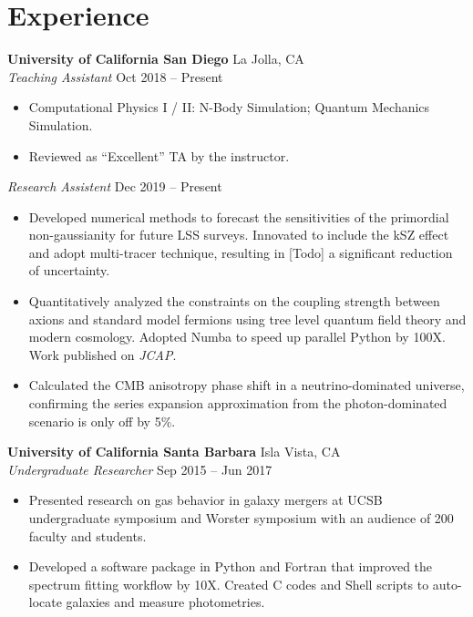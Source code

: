 \documentclass[letterpaper,12pt]{article}
\newenvironment{zitemize}{
\begin{itemize} \vspace{-.9em}\itemsep 0pt \parskip 0pt}
{\end{itemize}\vspace{-.5em}}
\newcommand{\todo}[1]{{\color{red} [Todo] #1}}
\newcommand{\proglang}[1]{#1}
\begin{document}
\section{Experience}
\textbf{University of California San Diego} \hfill La Jolla, CA \\
\textit{Teaching Assistant} \hfill Oct 2018 -- Present \\
\begin{zitemize}
    \item Computational Physics I / II: N-Body Simulation; Quantum Mechanics Simulation. \\
    \item Reviewed as ``Excellent'' TA by the instructor.
\end{zitemize}
\vspace{-0.5em}
\textit{Research Assistent} \hfill Dec 2019 -- Present \\
\begin{zitemize}
    \item Developed numerical methods to forecast the sensitivities of the primordial non-gaussianity for future LSS surveys. Innovated to include the kSZ effect and adopt multi-tracer technique, resulting in \todo{a significant reduction of uncertainty}.
    \item Quantitatively analyzed the constraints on the coupling strength between axions and standard model fermions using tree level quantum field theory and modern cosmology. Adopted \proglang{Numba} to speed up parallel \proglang{Python} by 100X. Work published on \textit{JCAP}.
    \item Calculated the CMB anisotropy phase shift in a neutrino-dominated universe, confirming the series expansion approximation from the photon-dominated scenario is only off by 5\%.
\end{zitemize}

\textbf{University of California Santa Barbara} \hfill Isla Vista, CA \\
\textit{Undergraduate Researcher} \hfill Sep 2015 -- Jun 2017 \\
\begin{zitemize}
    \item Presented research on gas behavior in galaxy mergers at UCSB undergraduate symposium and Worster symposium with an audience of 200 faculty and students.
    \item Developed a software package in \proglang{Python} and \proglang{Fortran} that improved the spectrum fitting workflow by 10X. Created \proglang{C} codes and \proglang{Shell} scripts to auto-locate galaxies and measure photometries.
\end{zitemize}
\end{document}
